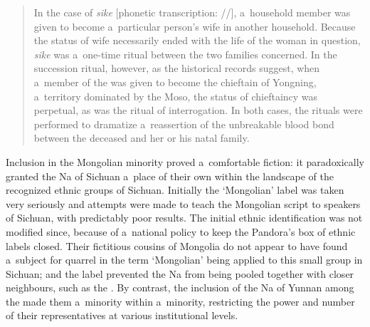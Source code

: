 \begin{quotation}
	In the case of \textit{sike} [phonetic transcription: //], a~household member was given to become a~particular person's wife in another household. Because the status of wife necessarily ended with the life of the woman in {question}, \textit{sike} was a~one-time ritual between the two families concerned. In the succession ritual, however, as the historical records suggest, when a~member of the  was given to become the chieftain of Yongning, a~territory dominated by the Moso, the status of chieftaincy was perpetual, as was the ritual of interrogation. In both cases, the rituals were performed to dramatize a~reassertion of the unbreakable blood bond between the deceased and her or his natal family. \citep[48]{shih2010}
\end{quotation}

Inclusion in the Mongolian minority proved a~comfortable fiction: it paradoxically granted the Na of Sichuan a~place of their own within the landscape of the recognized ethnic groups of Sichuan. Initially the ‘Mongolian’ label was taken very seriously and attempts were made to teach the Mongolian script to  speakers of Sichuan, with predictably poor results. The initial ethnic identification was not modified since, because of a~national policy to keep the Pandora’s box of ethnic labels closed. Their fictitious cousins of Mongolia do not appear to have found a~subject for quarrel in the term ‘Mongolian’ being applied to this small group in Sichuan; and the label prevented the Na from being pooled together with closer neighbours, such as the . By contrast, the inclusion of the Na of Yunnan among the  made them a~minority within a~minority, restricting the power and number of their representatives at various institutional levels. 

